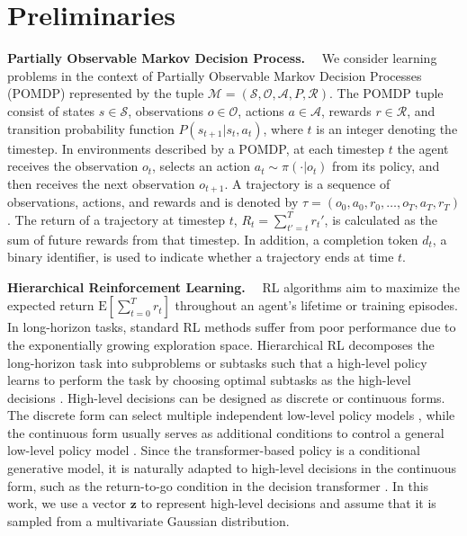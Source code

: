 \section{Preliminaries}

\noindent\textbf{Partially Observable Markov Decision Process.}~~
We consider learning problems in the context of Partially Observable Markov Decision Processes (POMDP) represented by the tuple $\mathcal{M}=(\mathcal{S,O,A},P, \mathcal{R})$. The POMDP tuple consist of states $s\in \mathcal{S} $, observations $o\in \mathcal{O} $, actions $a\in \mathcal{A} $, rewards $r\in \mathcal{R} $, and transition probability function $P (s_{t+1}|s_t,a_t)$, where $t$ is an integer denoting the timestep. In environments described by a POMDP, at each timestep $t$ the agent receives the observation $o_t$, selects an action $a_t \sim \pi(\cdot|o_t)$ from its policy, and then receives the next observation $o_{t+1}$. A trajectory is a sequence of observations, actions, and rewards and is denoted by $\tau=(o_0,a_0,r_0,\dots,o_T,a_T,r_T)$. The return of a trajectory at timestep $t$, $R_t = \sum_{t'=t}^Tr_t'$, is calculated as the sum of future rewards from that timestep.
In addition, a completion token $d_t$, a binary identifier, is used to indicate whether a trajectory ends at time $t$.

\noindent\textbf{Hierarchical Reinforcement Learning.}~~
RL algorithms aim to maximize the expected return $\mathrm{E}[\sum_{t=0}^Tr_t]$ throughout an agent's lifetime or training episodes. In long-horizon tasks, standard RL methods suffer from poor performance due to the exponentially growing exploration space. Hierarchical RL decomposes the long-horizon task into subproblems or subtasks such that a high-level policy learns to perform the task by choosing optimal subtasks as the high-level decisions \cite{18}. High-level decisions can be designed as discrete or continuous forms. The discrete form can select multiple independent low-level policy models \cite{19}, while the continuous form usually serves as additional conditions to control a general low-level policy model \cite{10}. Since the transformer-based policy is a conditional generative model, it is naturally adapted to high-level decisions in the continuous form, such as the return-to-go condition in the decision transformer \cite{2}. In this work, we use a vector $\textbf{z}$ to represent high-level decisions and assume that it is sampled from a multivariate Gaussian distribution.

